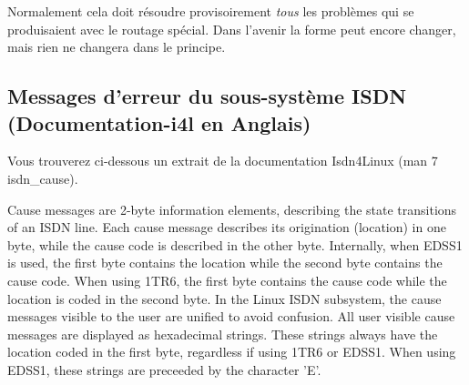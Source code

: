 Normalement cela doit résoudre provisoirement \emph{tous} les problèmes qui se 
produisaient avec le routage spécial. Dans l'avenir la forme peut encore changer, 
mais rien ne changera dans le principe.

{
  \subsection{Messages d'erreur du sous-système ISDN (Documentation-i4l en Anglais)}
}

Vous trouverez ci-dessous un extrait de la documentation Isdn4Linux (man 7 isdn\_cause).

Cause messages are 2-byte information elements, describing the state
transitions of an ISDN line. Each cause message describes its
origination (location) in one byte, while the cause code is described
in the other byte. Internally, when EDSS1 is used, the first byte
contains the location while the second byte contains the cause code.
When using 1TR6, the first byte contains the cause code while the
location is coded in the second byte. In the Linux ISDN subsystem, the
cause messages visible to the user are unified to avoid confusion. All
user visible cause messages are displayed as hexadecimal strings.
These strings always have the location coded in the first byte,
regardless if using 1TR6 or EDSS1. When using EDSS1, these strings are
preceeded by the character 'E'.


